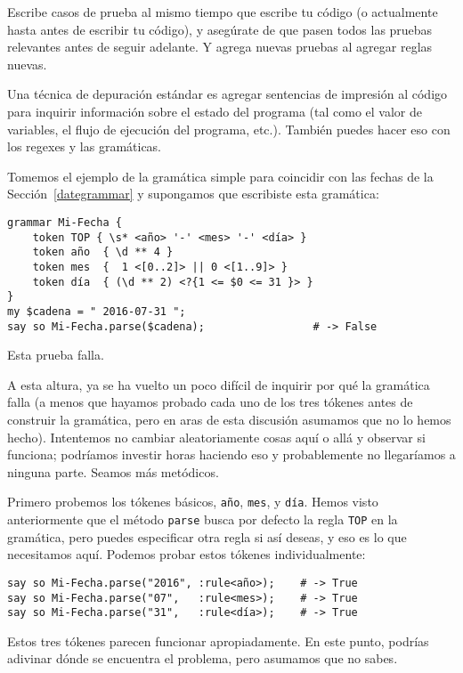 Escribe casos de prueba al mismo tiempo que escribe tu código 
(o actualmente hasta antes de escribir tu código), y asegúrate de
que pasen todos las pruebas relevantes antes de seguir adelante.
Y agrega nuevas pruebas al agregar reglas nuevas.


Una técnica de depuración estándar es agregar sentencias de 
impresión al código para inquirir información sobre el estado
del programa (tal como el valor de variables, el flujo de
ejecución del programa, etc.). También puedes hacer eso con
los regexes y las gramáticas.

Tomemos el ejemplo de la gramática simple para coincidir
con las fechas de la Sección~\ref{dategrammar} y supongamos
que escribiste esta gramática:

\begin{verbatim}
grammar Mi-Fecha {
    token TOP { \s* <año> '-' <mes> '-' <día> }
    token año  { \d ** 4 }                                        
    token mes  {  1 <[0..2]> || 0 <[1..9]> }                
    token día  { (\d ** 2) <?{1 <= $0 <= 31 }> }  
}                         
my $cadena = " 2016-07-31 ";
say so Mi-Fecha.parse($cadena);                 # -> False
\end{verbatim}

Esta prueba falla.

A esta altura, ya se ha vuelto un poco difícil de inquirir
por qué la gramática falla (a menos que hayamos probado cada
uno de los tres tókenes antes de construir la gramática,
pero en aras de esta discusión asumamos que no lo hemos hecho).
Intentemos no cambiar aleatoriamente cosas aquí o allá y observar
si funciona; podríamos investir horas haciendo eso y probablemente
no llegaríamos a ninguna parte. Seamos más metódicos.

Primero probemos los tókenes básicos, {\tt año}, {\tt mes}, y {\tt día}.
Hemos visto anteriormente que el método {\tt parse} busca por defecto
la regla {\tt TOP} en la gramática, pero puedes especificar otra 
regla si así deseas, y eso es lo que necesitamos aquí. 
Podemos probar estos tókenes individualmente:

\begin{verbatim}
say so Mi-Fecha.parse("2016", :rule<año>);    # -> True
say so Mi-Fecha.parse("07",   :rule<mes>);    # -> True
say so Mi-Fecha.parse("31",   :rule<día>);    # -> True
\end{verbatim}

Estos tres tókenes parecen funcionar apropiadamente. En este punto,
podrías adivinar dónde se encuentra el problema, pero 
asumamos que no sabes.

